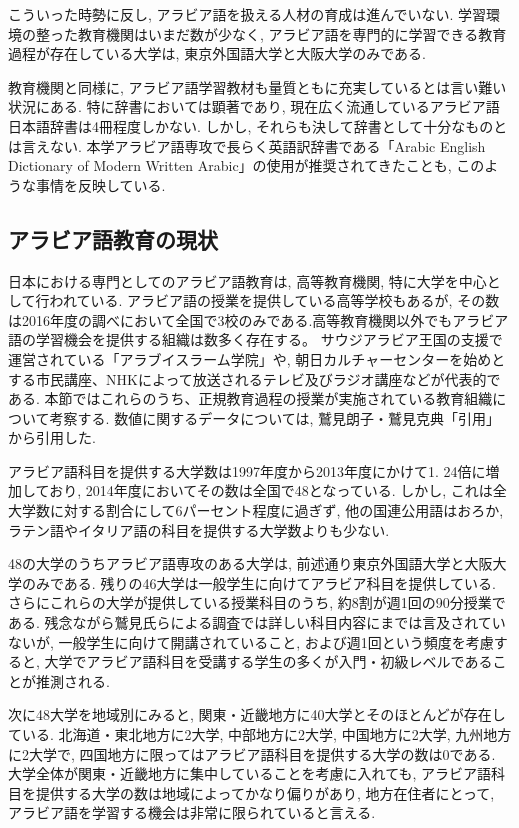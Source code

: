 \documentclass[technicalreport]{ieicej}
\begin{document}
こういった時勢に反し, アラビア語を扱える人材の育成は進んでいない. 学習環境の整った教育機関はいまだ数が少なく, アラビア語を専門的に学習できる教育過程が存在している大学は, 東京外国語大学と大阪大学のみである. 

教育機関と同様に, アラビア語学習教材も量質ともに充実しているとは言い難い状況にある. 特に辞書においては顕著であり, 現在広く流通しているアラビア語日本語辞書は4冊程度しかない. しかし, それらも決して辞書として十分なものとは言えない. 本学アラビア語専攻で長らく英語訳辞書である「Arabic English Dictionary of Modern Written Arabic」の使用が推奨されてきたことも, このような事情を反映している.

\subsection{アラビア語教育の現状}
日本における専門としてのアラビア語教育は, 高等教育機関, 特に大学を中心として行われている. アラビア語の授業を提供している高等学校もあるが, その数は2016年度の調べにおいて全国で3校のみである.高等教育機関以外でもアラビア語の学習機会を提供する組織は数多く存在する。 サウジアラビア王国の支援で運営されている「アラブイスラーム学院」や, 朝日カルチャーセンターを始めとする市民講座、NHKによって放送されるテレビ及びラジオ講座などが代表的である. 本節ではこれらのうち、正規教育過程の授業が実施されている教育組織について考察する. 数値に関するデータについては, 鷲見朗子・鷲見克典「引用」から引用した. 

アラビア語科目を提供する大学数は1997年度から2013年度にかけて1. 24倍に増加しており, 2014年度においてその数は全国で48となっている. しかし, これは全大学数に対する割合にして6パーセント程度に過ぎず, 他の国連公用語はおろか, ラテン語やイタリア語の科目を提供する大学数よりも少ない. 

48の大学のうちアラビア語専攻のある大学は, 前述通り東京外国語大学と大阪大学のみである. 残りの46大学は一般学生に向けてアラビア科目を提供している. さらにこれらの大学が提供している授業科目のうち, 約8割が週1回の90分授業である. 残念ながら鷲見氏らによる調査では詳しい科目内容にまでは言及されていないが, 一般学生に向けて開講されていること, および週1回という頻度を考慮すると, 大学でアラビア語科目を受講する学生の多くが入門・初級レベルであることが推測される. 

次に48大学を地域別にみると, 関東・近畿地方に40大学とそのほとんどが存在している. 北海道・東北地方に2大学, 中部地方に2大学, 中国地方に2大学, 九州地方に2大学で, 四国地方に限ってはアラビア語科目を提供する大学の数は0である. 大学全体が関東・近畿地方に集中していることを考慮に入れても, アラビア語科目を提供する大学の数は地域によってかなり偏りがあり, 地方在住者にとって, アラビア語を学習する機会は非常に限られていると言える. 
\end{document}
